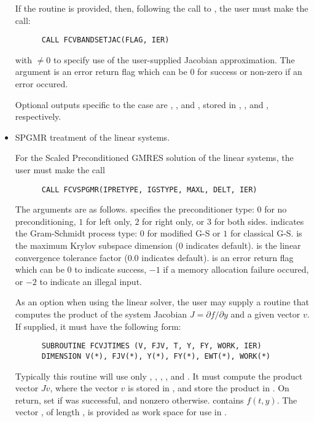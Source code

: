 \begin{Steps}
\begin{itemize}
    If the  routine is provided, then, following the call to ,
    the user must make the call:
\begin{verbatim}
      CALL FCVBANDSETJAC(FLAG, IER)
\end{verbatim}
    with $\neq 0$ to specify use of the user-supplied Jacobian approximation.
    The argument  is an error return flag which can be $0$ 
    for success or non-zero if an error occured.

    Optional outputs specific to the {\band} case are , , and ,
    stored in , , and , respectively.

  \item SPGMR treatment of the linear systems.

    For the Scaled Preconditioned GMRES solution of the linear systems,
    the user must make the call
\begin{verbatim}
      CALL FCVSPGMR(IPRETYPE, IGSTYPE, MAXL, DELT, IER)
\end{verbatim}
    The arguments are as follows.
     specifies the preconditioner type: 
       $0$ for no preconditioning, $1$ for left only, $2$ for right only, or $3$ for both sides.
     indicates the Gram-Schmidt process type: 
       $0$ for modified G-S or  $1$ for classical G-S.
     is the maximum Krylov subspace dimension ($0$ indicates default).
     is the linear convergence tolerance factor ($0.0$ indicates default).
     is an error return flag which can be $0$ to indicate success, 
       $-1$ if a memory allocation failure occured, or $-2$ to indicate an illegal input.
       
    As an option when using the {\spgmr} linear solver, the user may supply a 
    routine that computes the product of the system Jacobian 
    $J = \partial f / \partial y$ 
    and a given vector $v$.  If supplied, it must have the following form:
\begin{verbatim}
      SUBROUTINE FCVJTIMES (V, FJV, T, Y, FY, WORK, IER)
      DIMENSION V(*), FJV(*), Y(*), FY(*), EWT(*), WORK(*)
\end{verbatim}
    Typically this routine will use only , , , , and .
    It must compute the product vector $Jv$, where the vector $v$ is stored in , 
    and store the product in .  On return, set  if 
    was successful, and nonzero otherwise.
     contains $f(t,y)$. The vector , of length , is
    provided as work space for use in .


\end{itemize}
\end{Steps}
